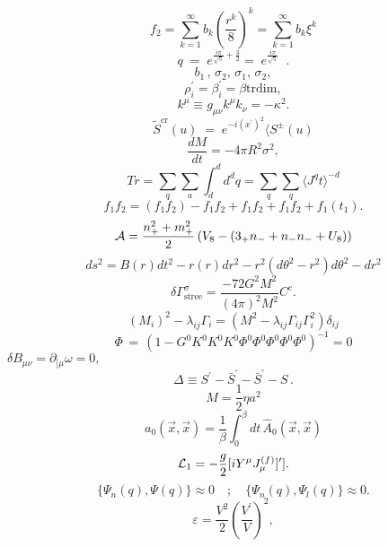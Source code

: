 \documentclass{article}
\begin{document}
$$f _ { 2 } = \sum _ { k = 1 } ^ { \infty } b _ { k } ( \frac { r ^ { k } } { 8 } ) ^ { k } = \sum _ { k = 1 } ^ { \infty } b _ { k } \xi ^ { k }$$
$$q \; = \; e ^ { \frac { i \pi } { \sqrt { 5 } } + \frac { 3 } { 2 } } = \; e ^ { \frac { i \pi } { \sqrt { 5 } } } \; \; .$$
$$b _ { 1 } \, , \, \sigma _ { 2 } , \, \sigma _ { 1 } , \, \sigma _ { 2 } ,$$
$$\rho _ { i } ^ { \prime } = \beta _ { i } ^ { \prime } = \beta \mathrm { t r } \mathrm { d i m } ,$$
$$k ^ { \mu } \equiv g _ { \mu \nu } k ^ { \mu } k _ { \nu } = - \kappa ^ { 2 } .$$
$$\tilde { S } ^ { \mathrm { c r } } ( u ) \; = \; e ^ { - i ( x ^ { \prime } ) ^ { 2 } } \langle S ^ { \pm } ( u )$$
$$\frac { d M } { d t } = - 4 \pi R ^ { 2 } \sigma ^ { 2 } ,$$
$$T r = \sum _ { q } \sum _ { a } \int _ { d } ^ { d } d ^ { d } q = \sum _ { q } \sum _ { q } \langle J ^ { q } t \rangle ^ { - d }$$
$$f _ { 1 } f _ { 2 } = ( f _ { 1 } f _ { 2 } ) - f _ { 1 } f _ { 2 } + f _ { 1 } f _ { 2 } + f _ { 1 } f _ { 2 } + f _ { 1 } ( t _ { 1 } ) .$$
$${ \cal A } = \frac { n _ { + } ^ { 2 } + m _ { + } ^ { 2 } } { 2 } \left ( V _ { 8 } - ( 3 _ { + } n _ { - } + n _ { - } n _ { - } + U _ { 8 } ) \right )$$
$$d s ^ { 2 } = B ( r ) d t ^ { 2 } - r ( r ) d r ^ { 2 } - r ^ { 2 } ( d \theta ^ { 2 } - r ^ { 2 } ) d \theta ^ { 2 } - d r ^ { 2 }$$
$$\delta \Gamma _ { \mathrm { s t r e e } } ^ { \sigma } = \frac { - 7 2 G ^ { 2 } M ^ { 2 } } { ( 4 \pi ) ^ { 2 } M ^ { 2 } } C ^ { c } .$$
$$( M _ { i } ) ^ { 2 } - \lambda _ { i j } \Gamma _ { i } = ( M ^ { 2 } - \lambda _ { i j } \Gamma _ { i j } \Gamma _ { i } ^ { 2 } ) \delta _ { i j }$$
$$\Phi \, = \, ( 1 - G ^ { 0 } K ^ { 0 } K ^ { 0 } K ^ { 0 } \Phi ^ { 0 } \Phi ^ { 0 } \Phi ^ { 0 } \Phi ^ { 0 } \Phi ^ { 0 } ) ^ { - 1 } = 0$$
$$\delta B _ { \mu \nu } = \partial _ { [ \mu } \omega = 0 , ~ ~ ~ ~ ~ ~ ~ ~ ~ ~ ~ ~ ~ ~ ~ ~ ~ ~ ~ ~ ~ ~ ~ ~ ~ ~ ~ ~ ~ ~ ~ ~ ~ ~ ~ ~ ~ ~ ~ ~ ~ ~ ~ ~ ~ ~ ~ ~ ~ ~ ~ ~ ~ ~ ~ ~ ~ ~ ~ ~ ~ ~ ~ ~ ~ ~ ~ ~ ~ ~ ~ ~ ~ ~ ~ ~ ~ ~ ~ ~ ~ ~ ~ ~ ~ ~ ~ ~ ~ ~ ~ ~ ~ ~ ~ ~ ~ ~ ~ ~ ~ ~ ~ ~ ~ ~ ~ ~ ~ ~ ~ ~ ~ ~ ~ ~ ~ ~ ~ ~ ~ ~ ~ ~ ~ ~ ~ ~ ~ ~ ~ ~$$
$$\Delta \equiv S ^ { \prime } - \bar { S } ^ { \prime } - \bar { S } ^ { \prime } - S \, .$$
$$M = \frac { 1 } { 2 } \eta a ^ { 2 }$$
$$a _ { 0 } ( \vec { x } , \vec { x } ) = \frac { 1 } { \beta } \int _ { 0 } ^ { \beta } d t \, \hat { A } _ { 0 } ( \vec { x } , \vec { x } )$$
$${ \cal L } _ { 1 } = - \frac { g } { 2 } [ i Y ^ { \mu } J _ { \mu } ^ { ( f ) } ] ^ { \prime } ] .$$
$$\{ \Psi _ { n } ( q ) , \Psi ( q ) \} \approx 0 \quad ; \quad \{ \Psi _ { n } ( q ) , \Psi _ { l } ( q ) \} \approx 0 .$$
$$\varepsilon = \frac { V ^ { 2 } } { 2 } \left ( \frac { V ^ { \prime } } { V } \right ) ^ { 2 } ,$$
\end{document}
